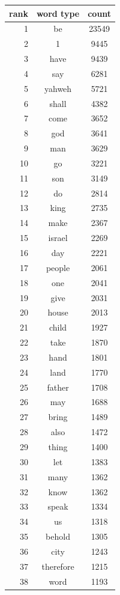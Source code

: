 \begin{figure}
  \begin{tiny}
  \begin{centering}
  \begin{tabular}{|r|c|c|}
    \hline
    rank & word type & count \\
    \hline
1 & be & 23549 \\
2 & 1 & 9445 \\
3 & have & 9439 \\
4 & say & 6281 \\
5 & yahweh & 5721 \\
6 & shall & 4382 \\
7 & come & 3652 \\
8 & god & 3641 \\
9 & man & 3629 \\
10 & go & 3221 \\
11 & son & 3149 \\
12 & do & 2814 \\
13 & king & 2735 \\
14 & make & 2367 \\
15 & israel & 2269 \\
16 & day & 2221 \\
17 & people & 2061 \\
18 & one & 2041 \\
19 & give & 2031 \\
20 & house & 2013 \\
21 & child & 1927 \\
22 & take & 1870 \\
23 & hand & 1801 \\
24 & land & 1770 \\
25 & father & 1708 \\
26 & may & 1688 \\
27 & bring & 1489 \\
28 & also & 1472 \\
29 & thing & 1400 \\
30 & let & 1383 \\
31 & many & 1362 \\
32 & know & 1362 \\
33 & speak & 1334 \\
34 & us & 1318 \\
35 & behold & 1305 \\
36 & city & 1243 \\
37 & therefore & 1215 \\
38 & word & 1193 \\

\end{tabular}
\end{centering}
\end{tiny}
\end{figure}
